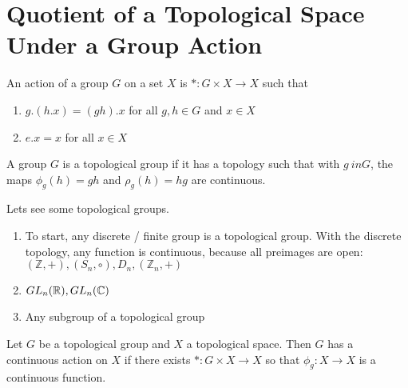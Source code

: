 \documentclass{article}
\begin{document}
\section{Quotient of a Topological Space Under a Group Action}

\begin{definition}
    An action of a group $G$ on a set $X$ is $*: G \times X \to X$ such that
    \begin{enumerate}
        \item $g.(h.x) = (gh). x$ for all $g,h \in G$ and $x \in X$ 
        \item $e . x = x$ for all $x \in X$
    \end{enumerate}
\end{definition}

\begin{definition}
    A group $G$ is a topological group if it has a topology such that with $g \ in G$, the maps $\phi_g(h) = gh$ and $\rho_g(h) = hg$ are continuous.
\end{definition}

Lets see some topological groups.
\begin{enumerate}
    \item To start, any discrete / finite group is a topological group. With the discrete topology, any function is continuous, because all preimages are open: $(\mathbb{Z}, +), (S_n, \circ), D_n, (\mathbb{Z}_n, +)$
    \item $GL_n(\mathbb{R}), GL_n(\mathbb{C})$
    \item Any subgroup of a topological group
\end{enumerate}

\begin{definition}
    Let $G$ be a topological group and $X$ a topological space. Then $G$ has a continuous action on $X$ if there exists $*: G \times X \to X$ so that $\phi_g: X \to X$ is a continuous function.
\end{definition}
\end{document}
